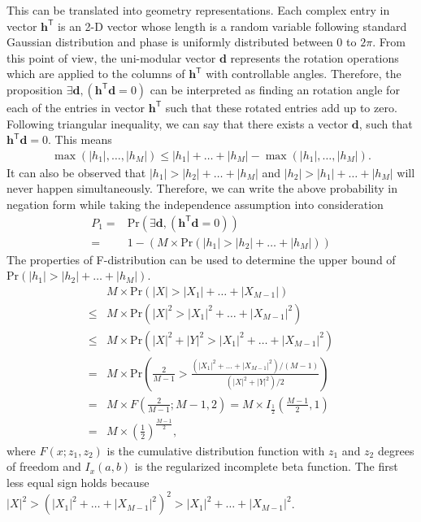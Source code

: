 \documentclass[12pt,draftclsnofoot,onecolumn,journal]{IEEEtran}
\begin{document}
This can be translated into geometry representations. Each complex entry in vector $\mathbf h^{\mathsf{T}}$ is an 2-D vector whose length is a random variable following standard Gaussian distribution and phase is uniformly distributed between $0$ to $2\pi$. From this point of view, the uni-modular vector $\mathbf d$ represents the rotation operations which are applied to the columns of $\mathbf h^{\mathsf{T}}$ with controllable angles. Therefore, the proposition $\exists \mathbf d,(\mathbf h^{\mathsf{T}} \mathbf d=0)$ can be interpreted as finding an rotation angle for each of the entries in vector $\mathbf h^{\mathsf{T}}$ such that these rotated entries add up to zero. Following triangular inequality, we can say that there exists a vector $\mathbf d$, such that $\mathbf h^{\mathsf{T}} \mathbf d=0$. This means
\begin{equation}
\begin{split}
\max(|h_1|, \dots, |h_M|)\leq|h_1|+\dots+|h_M|-\max(|h_1|, \dots, |h_M|).
\end{split}
\end{equation}
It can also be observed that $|h_1|>|h_2|+\dots+|h_M|$ and  $|h_2|>|h_1|+\dots+|h_M|$ will never happen simultaneously. Therefore, we can write the above probability in negation form while taking the independence assumption into consideration
 \begin{equation}
\begin{split}
P_1=&\mathrm{Pr}(\exists \mathbf d,(\mathbf h^{\mathsf{T}} \mathbf d=0))\\
=&1-(M\times \mathrm{Pr}(|h_1|>|h_2|+\dots+|h_M|))
\end{split}
\end{equation}
The properties of F-distribution can be used to determine the upper bound of $\mathrm{Pr}(|h_1|>|h_2|+\dots+|h_M|)$.
\begin{equation}
\begin{split}
&M\times \mathrm{Pr}(|X|>|X_1|+\dots+|X_{M-1}|)\\
\leq &M\times \mathrm{Pr}(|X|^2>|X_1|^2+\dots+|X_{M-1}|^2)\\
\leq &M\times \mathrm{Pr}(|X|^2+|Y|^2>|X_1|^2+\dots+|X_{M-1}|^2)\\
= &M\times \mathrm{Pr}\left(\frac{2}{M-1}>\frac{(|X_1|^2+\dots+|X_{M-1}|^2)/(M-1)}{(|X|^2+|Y|^2)/2}\right)\\
=&M\times F\left(\frac{2}{M-1}; M-1, 2\right)=M\times I_{\frac{1}{2}}\left(\frac{M-1}{2}, 1\right)\\
=&M\times \left(\frac{1}{2}\right)^{\frac{M-1}{2}},
\end{split}
\end{equation}
where $F(x; z_1, z_2)$ is the cumulative distribution function with $z_1$ and $z_2$ degrees of freedom and $I_x(a,b)$ is the regularized incomplete beta function.
The first less equal sign holds because $|X|^2>(|X_1|^2+\dots+|X_{M-1}|^2)^2>|X_1|^2+\dots+|X_{M-1}|^2$.
\end{document}
